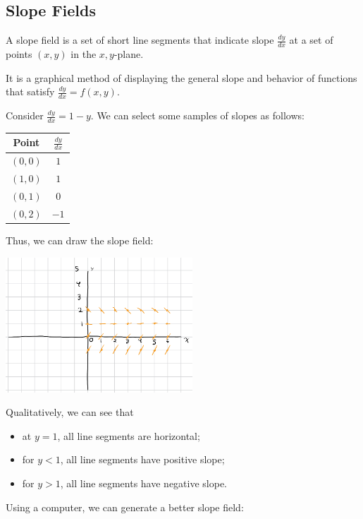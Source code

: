 \documentclass[10pt]{mypackage}
\begin{document}
\subsection{Slope Fields}%
\begin{definition}
  A slope field is a set of short line segments that indicate slope $\frac{dy}{dx}$ at a set of points $(x,y)$ in the $x,y$-plane.\newline

  It is a graphical method of displaying the general slope and behavior of functions that satisfy $\frac{dy}{dx} = f(x,y)$.
\end{definition}
\begin{example}
  Consider $\frac{dy}{dx} = 1-y$. We can select some samples of slopes as follows:
  \begin{center}
    \begin{tabular}{c|c}
      Point & $\frac{dy}{dx}$\\
      \hline
      $(0,0)$ & $1$\\
      $(1,0)$ & $1$\\
      $(0,1)$ & $0$\\
      $(0,2)$ & $-1$
    \end{tabular}
  \end{center}
  Thus, we can draw the slope field:
  \begin{center}
    \includegraphics[width=7cm]{images/slope_field_2.png}
  \end{center}
  Qualitatively, we can see that
  \begin{itemize}
    \item at $y = 1$, all line segments are horizontal;
    \item for $y < 1$, all line segments have positive slope;
    \item for $y > 1$, all line segments have negative slope.
  \end{itemize}
  Using a computer, we can generate a better slope field:
  \begin{center}
    \begin{tikzpicture}

\end{tikzpicture}
\end{center}
\end{example}
\end{document}
